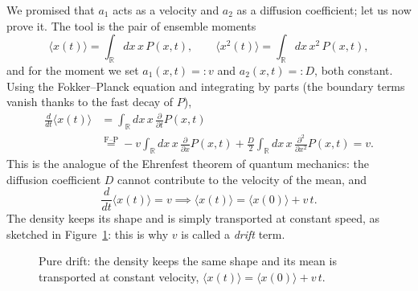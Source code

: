 We promised that $a_1$ acts as a velocity and $a_2$ as a diffusion coefficient; let us now prove it.
The tool is the pair of ensemble moments
\begin{equation}
\langle x(t)\rangle = \int_{\mathbb{R}} dx\, x\, P(x,t),\qquad
\langle x^2(t)\rangle = \int_{\mathbb{R}} dx\, x^2\, P(x,t),
\end{equation}
and for the moment we set $a_1(x,t)=:v$ and $a_2(x,t)=:D$, both constant.
Using the Fokker--Planck equation and integrating by parts (the boundary terms vanish thanks to the fast decay of $P$),
\begin{equation}\begin{split}
\frac{d}{dt}\langle x(t)\rangle &= \int_{\mathbb{R}} dx\, x\, \frac{\partial}{\partial t}P(x,t)\\
&\overset{\text{F--P}}{=} -v\int_{\mathbb{R}} dx\, x\, \frac{\partial}{\partial x}P(x,t) + \frac{D}{2}\int_{\mathbb{R}} dx\, x\, \frac{\partial^2}{\partial x^2}P(x,t) = v.
\end{split}\end{equation}
This is the analogue of the Ehrenfest theorem of quantum mechanics: the diffusion coefficient $D$ cannot contribute to the velocity of the mean, and
\begin{equation}
\frac{d}{dt}\langle x(t)\rangle = v \implies \langle x(t)\rangle = \langle x(0)\rangle + v\,t.
\end{equation}
The density keeps its shape and is simply transported at constant speed, as sketched in Figure~\ref{fig:drift}: this is why $v$ is called a \emph{drift} term.

\begin{figure}[h!]
\centering
{}
\caption{Pure drift: the density keeps the same shape and its mean is transported at constant velocity, $\langle x(t)\rangle=\langle x(0)\rangle+v\,t$.}
\label{fig:drift}
\end{figure}

